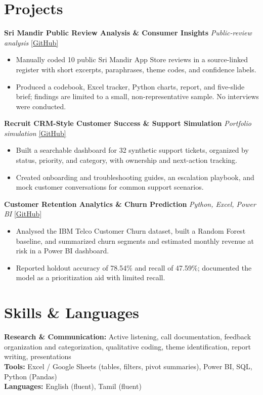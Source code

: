 \documentclass[10pt,a4paper]{article}
\newcommand{\project}[3]{\textbf{#1} \hfill \textit{#2} \href{#3}{[GitHub]}\vspace{1pt}}
\begin{document}
\section*{Projects}
\project{Sri Mandir Public Review Analysis \& Consumer Insights}{Public-review analysis}{https://github.com/06SharXD/sri-mandir-consumer-insights-review-study}
\begin{itemize}
  \item Manually coded 10 public Sri Mandir App Store reviews in a source-linked register with short excerpts, paraphrases, theme codes, and confidence labels.
  \item Produced a codebook, Excel tracker, Python charts, report, and five-slide brief; findings are limited to a small, non-representative sample. No interviews were conducted.
\end{itemize}
\vspace{2pt}
\project{Recruit CRM-Style Customer Success \& Support Simulation}{Portfolio simulation}{https://github.com/06SharXD/recruitment-crm-customer-success-simulation}
\begin{itemize}
  \item Built a searchable dashboard for 32 synthetic support tickets, organized by status, priority, and category, with ownership and next-action tracking.
  \item Created onboarding and troubleshooting guides, an escalation playbook, and mock customer conversations for common support scenarios.
\end{itemize}
\vspace{2pt}
\project{Customer Retention Analytics \& Churn Prediction}{Python, Excel, Power BI}{https://github.com/06SharXD/Customer-Retention-Analytics-Engine}
\begin{itemize}
  \item Analysed the IBM Telco Customer Churn dataset, built a Random Forest baseline, and summarized churn segments and estimated monthly revenue at risk in a Power BI dashboard.
  \item Reported holdout accuracy of 78.54\% and recall of 47.59\%; documented the model as a prioritization aid with limited recall.
\end{itemize}
\section*{Skills \& Languages}
\textbf{Research \& Communication:} Active listening, call documentation, feedback organization and categorization, qualitative coding, theme identification, report writing, presentations\\
\textbf{Tools:} Excel / Google Sheets (tables, filters, pivot summaries), Power BI, SQL, Python (Pandas)\\
\textbf{Languages:} English (fluent), Tamil (fluent)
\end{document}
